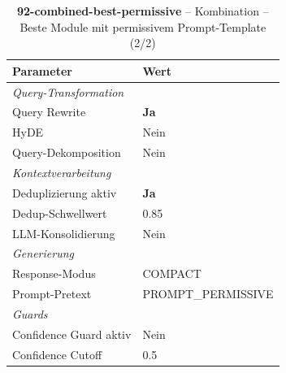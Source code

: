 \begin{table}[H]
\centering
\small
\setlength{\tabcolsep}{4pt}
\begin{tabular}{lp{8cm}}
\toprule
\textbf{Parameter} & \textbf{Wert} \\
\midrule
\multicolumn{2}{l}{\textit{Query-Transformation}} \\
\midrule
\quad Query Rewrite & \textbf{Ja} \\
\quad HyDE & Nein \\
\quad Query-Dekomposition & Nein \\
\midrule
\multicolumn{2}{l}{\textit{Kontextverarbeitung}} \\
\midrule
\quad Deduplizierung aktiv & \textbf{Ja} \\
\quad Dedup-Schwellwert & 0.85 \\
\quad LLM-Konsolidierung & Nein \\
\midrule
\multicolumn{2}{l}{\textit{Generierung}} \\
\midrule
\quad Response-Modus & COMPACT \\
\quad Prompt-Pretext & PROMPT\_PERMISSIVE \\
\midrule
\multicolumn{2}{l}{\textit{Guards}} \\
\midrule
\quad Confidence Guard aktiv & Nein \\
\quad Confidence Cutoff & 0.5 \\
\bottomrule
\end{tabular}
\caption{\textbf{92-combined-best-permissive} -- Kombination -- Beste Module mit permissivem Prompt-Template (2/2)}
\label{tab:config_92_combined_best_permissive_b}
\end{table}
